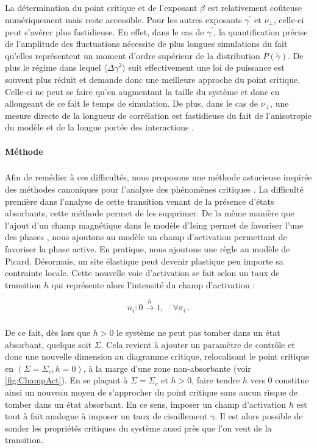 \subparagraph{}La détermination du point critique et de l'exposant $\beta$ est relativement coûteuse numériquement mais reste accessible. Pour les autres exposants $\gamma^\prime$ et $\nu_\perp$, celle-ci peut s'avérer plus fastidieuse. En effet, dans le cas de $\gamma^\prime$, la quantification précise de l'amplitude des fluctuations nécessite de plus longues simulations du fait qu'elles représentent un moment d'ordre supérieur de la distribution $P(\dot{\gamma})$. De plus le régime dans lequel $\langle\Delta\dot{\gamma}^2\rangle$ suit effectivement une loi de puissance est souvent plus réduit et demande donc une meilleure approche du point critique. Celle-ci ne peut se faire qu'en augmentant la taille du système et donc en allongeant de ce fait le temps de simulation. De plus, dans le cas de $\nu_\perp$, une mesure directe de la longueur de corrélation est fastidieuse du fait de l'anisotropie du modèle et de la longue portée des interactions \cite{liu_critical_2016}.

\paragraph{Méthode}

\label{sec:methodeFSS}

\subparagraph{}Afin de remédier à ces difficultés, nous proposons une méthode astucieuse inspirée des méthodes canoniques pour l'analyse des phénomènes critiques \cite{lubeck_universal_2004}. La difficulté première dans l'analyse de cette transition venant de la présence d'états absorbants, cette méthode permet de les supprimer. De la même manière que l'ajout d'un champ magnétique dans le modèle d'Ising permet de favoriser l'une des phases \cite{kardar_statistical_2007}, nous ajoutons au modèle un champ d'activation permettant de favoriser la phase active. En pratique, nous ajoutons une règle au modèle de Picard. Désormais, un site élastique peut devenir plastique peu importe sa contrainte locale. Cette nouvelle voie d'activation se fait selon un taux de transition $h$ qui représente alors l'intensité du champ d'activation :

\begin{equation}
n_i: 0\xrightarrow{h}1,\quad \forall \sigma_i \, .
\end{equation}

\subparagraph{}De ce fait, dès lors que $h>0$ le système ne peut pas tomber dans un état absorbant, quelque soit $\Sigma$. Cela revient à ajouter un paramètre de contrôle et donc une nouvelle dimension au diagramme critique, relocalisant le point critique en $(\Sigma = \Sigma_c, h=0)$, à la marge d'une zone non-absorbante (voir \autoref{fig:ChampAct}). En se plaçant à $\Sigma = \Sigma_c$ et $h>0$, faire tendre $h$ vers $0$ constitue ainsi un nouveau moyen de s'approcher du point critique sans aucun risque de tomber dans un état absorbant. En ce sens, imposer un champ d'activation $h$ est tout à fait analogue à imposer un taux de cisaillement $\dot{\gamma}$. Il est alors possible de sonder les propriétés critiques du système aussi près que l'on veut de la transition.

